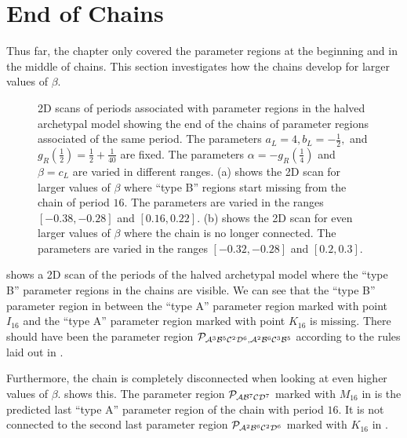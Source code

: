 \section{End of Chains}
\label{sec:arch.end}

Thus far, the chapter only covered the parameter regions at the beginning and in the middle of chains.
This section investigates how the chains develop for larger values of $\beta$.

\begin{figure}
	\centering
	\caption[2D scans of periods associated with parameter regions in the halved archetypal model showing the end of the chains]{
		2D scans of periods associated with parameter regions in the halved archetypal model showing the end of the chains of parameter regions associated of the same period.
		The parameters $a_L = 4, b_L = -\frac{1}{2},$ and $g_R\left(\frac{1}{2}\right) = \frac{1}{2} + \frac{1}{40}$ are fixed.
		The parameters $\alpha = -g_R\left(\frac{1}{4}\right)$ and $\beta = c_L$ are varied in different ranges.
		(a) shows the 2D scan for larger values of $\beta$ where ``type B'' regions start missing from the chain of period $16$.
		The parameters are varied in the ranges $[-0.38, -0.28]$ and $[0.16, 0.22]$.
		(b) shows the 2D scan for even larger values of $\beta$ where the chain is no longer connected.
		The parameters are varied in the ranges $[-0.32, -0.28]$ and $[0.2, 0.3]$.
	}
\end{figure}

 shows a 2D scan of the periods of the halved archetypal model where the ``type B'' parameter regions in the chains are visible.
We can see that the ``type B'' parameter region in  between the ``type A'' parameter region marked with point $I_{16}$ and the ``type A'' parameter region marked with point $K_{16}$ is missing.
There should have been the parameter region $\mathcal{P}_{\mathcal{A}^3\mathcal{B}^5\mathcal{C}^2\mathcal{D}^6, \mathcal{A}^2\mathcal{B}^6\mathcal{C}^3\mathcal{B}^5}$ according to the rules laid out in .

Furthermore, the chain is completely disconnected when looking at even higher values of $\beta$.
 shows this.
The parameter region $\mathcal{P}_{\mathcal{A}\mathcal{B}^7\mathcal{C}\mathcal{D}^7}$ marked with $M_{16}$ in  is the predicted last ``type A'' parameter region of the chain with period $16$.
It is not connected to the second last parameter region $\mathcal{P}_{\mathcal{A}^2\mathcal{B}^6\mathcal{C}^2\mathcal{D}^6}$ marked with $K_{16}$ in .

